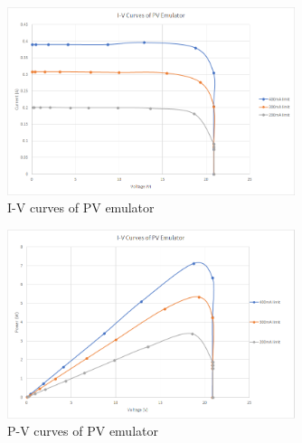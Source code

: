 \documentclass[]{article}
\begin{document}
				\begin{figure}[H]
					\centering
					\includegraphics[width=0.75\textwidth]{Lab4Results/IV_Curve}
					\caption{I-V curves of PV emulator}
					\label{fig:lab4IVCurve}
				\end{figure}
	 			\begin{figure}[H]
	 				\centering
	 				\includegraphics[width=0.75\textwidth]{Lab4Results/PV_Curve}
	 				\caption{P-V curves of PV emulator}
	 				\label{fig:lab4PVCurve}
	 			\end{figure}
\end{document}
